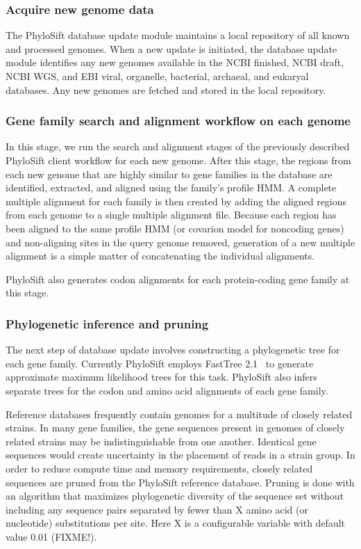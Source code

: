 \documentclass[10pt]{article}
\begin{document}
\subsubsection*{Acquire new genome data}
The PhyloSift database update module maintains a local repository of all known and processed genomes.
When a new update is initiated, the database update module identifies any new genomes available in the NCBI finished, NCBI draft, NCBI WGS, and EBI viral, organelle, bacterial, archaeal, and eukaryal databases.
Any new genomes are fetched and stored in the local repository.
\subsubsection*{Gene family search and alignment workflow on each genome}
In this stage, we run the search and alignment stages of the previously described PhyloSift client workflow for each new genome.
After this stage, the regions from each new genome that are highly similar to gene families in the database are identified, extracted, and aligned using the family's profile HMM.
A complete multiple alignment for each family is then created by adding the aligned regions from each genome to a single multiple alignment file.
Because each region has been aligned to the same profile HMM (or covarion model for noncoding genes) and non-aligning sites in the query genome removed, generation of a new multiple alignment is a simple matter of concatenating the individual alignments.

PhyloSift also generates codon alignments for each protein-coding gene family at this stage.
\subsubsection*{Phylogenetic inference and pruning}
The next step of database update involves constructing a phylogenetic tree for each gene family.
Currently PhyloSift employs FastTree 2.1~\cite{Price2010} to generate approximate maximum likelihood trees for this task.
PhyloSift also infers separate trees for the codon and amino acid alignments of each gene family. 

Reference databases frequently contain genomes for a multitude of closely related strains. 
In many gene families, the gene sequences present in genomes of closely related strains may be indistinguishable from one another.
Identical gene sequences would create uncertainty in the placement of reads in a strain group.
In order to reduce compute time and memory requirements, closely related sequences are pruned from the PhyloSift reference database. 
Pruning is done with an algorithm that maximizes phylogenetic diversity of the sequence set without including any sequence pairs separated by fewer than X amino acid (or nucleotide) substitutions per site.
Here X is a configurable variable with default value 0.01 (FIXME!).
\end{document}
